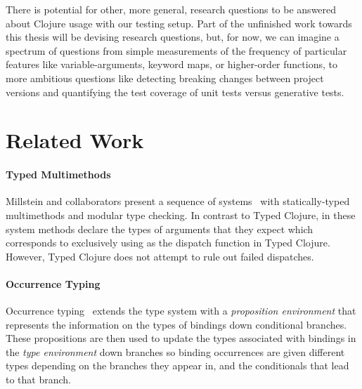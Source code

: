 \documentclass[9pt]{extarticle}
\begin{document}
There is potential for other, more general, research questions
to be answered about Clojure usage with our testing setup.
Part of the unfinished work towards this thesis will be devising research questions,
but, for now, we can imagine a spectrum of questions
from simple measurements of the frequency of particular features like variable-arguments,
keyword maps, or higher-order functions, to more ambitious questions
like detecting breaking changes between project versions
and quantifying the test coverage of unit tests versus generative tests.

\section{Related Work}

\paragraph{Typed Multimethods} 
Millstein and collaborators present a sequence of
systems~\cite{Chambers:1992:OMC,Chambers:1994:TMM,MS02} with statically-typed multimethods
and modular type checking.  In contrast to Typed Clojure, in these
system methods declare the types of arguments that they expect which
corresponds to exclusively using  as the dispatch function
in Typed Clojure. However, Typed Clojure does not attempt to rule out
failed dispatches.


\paragraph{Occurrence Typing} 
Occurrence typing~\cite{TF08,TF10} extends the type 
system with a \emph{proposition environment} that represents 
the information on the types of bindings down conditional branches.
These propositions are then used to update the types associated
with bindings in the \emph{type environment} down branches
so binding occurrences are given different types 
depending on the branches they appear in, and the conditionals
that lead to that branch.


\end{document}
